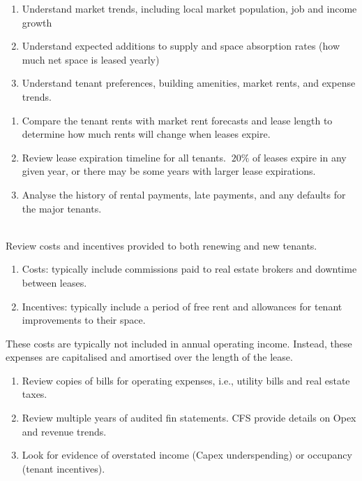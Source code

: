 \begin{remark} 
\begin{enumerate}[label=\roman*.]
\setlength{\itemsep}{0pt}
\item Understand market trends, including local market population, job and income growth
\item Understand expected additions to supply and space absorption rates (how much net space is leased yearly)
\item Understand tenant preferences, building amenities, market rents, and expense trends.
\end{enumerate}
\end{remark}

\begin{remark} 
\begin{enumerate}[label=\roman*.]
\setlength{\itemsep}{0pt}
\item Compare the tenant rents with market rent forecasts and lease length to determine how much rents will change when leases expire.
\item Review lease expiration timeline for all tenants. $~20\%$ of leases expire in any given year, or there may be some years with larger lease expirations.
\item Analyse the history of rental payments, late payments, and any defaults for the major tenants.
\end{enumerate}
\end{remark}

\begin{remark} \\
Review costs and incentives provided to both renewing and new tenants.
\begin{enumerate}[label=\roman*.]
\setlength{\itemsep}{0pt}
\item Costs: typically include commissions paid to real estate brokers and downtime between leases.
\item Incentives: typically include a period of free rent and allowances for tenant improvements to their space.
\end{enumerate}
These costs are typically not included in annual operating income. Instead, these expenses are capitalised and amortised over the length of the lease.
\end{remark}

\begin{remark} 
\begin{enumerate}[label=\roman*.]
\setlength{\itemsep}{0pt}
\item Review copies of bills for operating expenses, i.e., utility bills and real estate taxes.
\item Review multiple years of audited fin statements. CFS provide details on Opex and revenue trends.
\item Look for evidence of overstated income (Capex underspending) or occupancy (tenant incentives).
\end{enumerate}
\end{remark}

